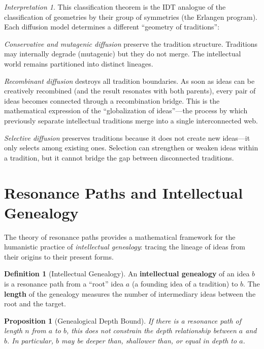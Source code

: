 \documentclass[11pt,openany]{book}
\theoremstyle{definition}
\newtheorem{definition}[axiom]{Definition}
\theoremstyle{plain}
\newtheorem{proposition}[axiom]{Proposition}
\theoremstyle{remark}
\newtheorem{interpretation}[axiom]{Interpretation}
\begin{document}
\begin{interpretation}
This classification theorem is the IDT analogue of the classification of geometries by their group of symmetries (the Erlangen program). Each diffusion model determines a different ``geometry of traditions'':

\emph{Conservative and mutagenic diffusion} preserve the tradition structure. Traditions may internally degrade (mutagenic) but they do not merge. The intellectual world remains partitioned into distinct lineages.

\emph{Recombinant diffusion} destroys all tradition boundaries. As soon as ideas can be creatively recombined (and the result resonates with both parents), every pair of ideas becomes connected through a recombination bridge. This is the mathematical expression of the ``globalization of ideas''---the process by which previously separate intellectual traditions merge into a single interconnected web.

\emph{Selective diffusion} preserves traditions because it does not create new ideas---it only selects among existing ones. Selection can strengthen or weaken ideas within a tradition, but it cannot bridge the gap between disconnected traditions.
\end{interpretation}

\section{Resonance Paths and Intellectual Genealogy}

The theory of resonance paths provides a mathematical framework for the humanistic practice of \emph{intellectual genealogy}: tracing the lineage of ideas from their origins to their present forms.

\begin{definition}[Intellectual Genealogy]
An \textbf{intellectual genealogy} of an idea $b$ is a resonance path from a ``root'' idea $a$ (a founding idea of a tradition) to $b$. The \textbf{length} of the genealogy measures the number of intermediary ideas between the root and the target.
\end{definition}

\begin{proposition}[Genealogical Depth Bound]
If there is a resonance path of length $n$ from $a$ to $b$, this does not constrain the depth relationship between $a$ and $b$. In particular, $b$ may be deeper than, shallower than, or equal in depth to $a$.
\end{proposition}
\end{document}
